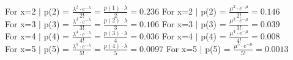\documentclass[11pt]{article}
\begin{document}
For x=2 $\lvert$ p(2) = $\frac{\lambda^2\cdot e^{-\lambda}}{2!} = \frac{p(1)\cdot \lambda}{2} = 0.236$ \hspace{12mm} For x=2 $\lvert$ p(2) = $\frac{\mu^2\cdot e^{-\mu}}{2!} = 0.146$
\\
For x=3 $\lvert$ p(3) = $\frac{\lambda^3\cdot e^{-\lambda}}{3!} = \frac{p(2)\cdot \lambda}{3} = 0.106$ \hspace{12mm} For x=3 $\lvert$ p(3) = $\frac{\mu^3\cdot e^{-\mu}}{3!} = 0.039$
\\
For x=4 $\lvert$ p(4) = $\frac{\lambda^4\cdot e^{-\lambda}}{4!} = \frac{p(3)\cdot \lambda}{4} = 0.036$ \hspace{12mm} For x=4 $\lvert$ p(4) = $\frac{\mu^4\cdot e^{-\mu}}{4!} = 0.008$
\\
For x=5 $\lvert$ p(5) = $\frac{\lambda^5\cdot e^{-\lambda}}{5!} = \frac{p(4)\cdot \lambda}{5} = 0.0097$ \hspace{10mm} For x=5 $\lvert$ p(5) = $\frac{\mu^5\cdot e^{-\mu}}{5!} = 0.0013$\\
\end{document}
